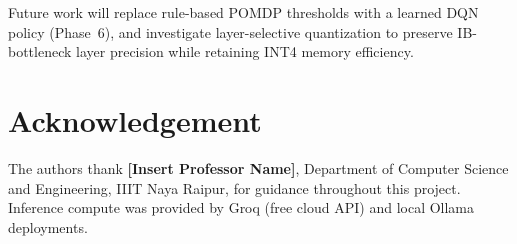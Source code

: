 \documentclass[conference]{IEEEtran}
\begin{document}
Future work will replace
rule-based POMDP thresholds with a learned DQN policy (Phase~6), and
investigate layer-selective quantization to preserve IB-bottleneck
layer precision while retaining INT4 memory efficiency.

\section*{Acknowledgement}
The authors thank \textbf{[Insert Professor Name]}, Department of Computer
Science and Engineering, IIIT Naya Raipur, for guidance throughout
this project. Inference compute was provided by Groq (free cloud API)
and local Ollama deployments.
\end{document}
